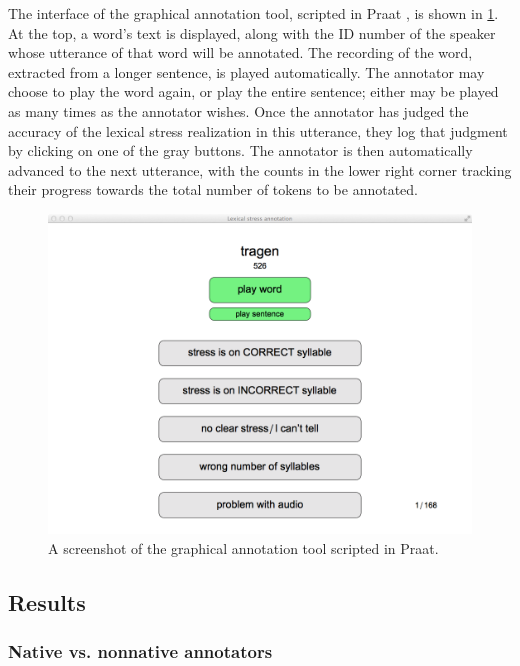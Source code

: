 	

	
	The interface of the graphical annotation tool, scripted in Praat \parencite{Boersma2014}, is shown in \cref{fig:annotationtool}. At the top, a word's text is displayed, along with the ID number of the speaker whose utterance of that word will be annotated. The recording of the word, extracted from a longer sentence, is played automatically. The annotator may choose to play the word again, or play the entire sentence; either may be played as many times as the annotator wishes. Once the annotator has judged the accuracy of the lexical stress realization in this utterance, they log that judgment by clicking on one of the gray buttons. The annotator is then automatically advanced to the next utterance, with the counts in the lower right corner tracking their progress towards the total number of tokens to be annotated. 
	
		\begin{figure}[bht]
			\centering
			\includegraphics[width=\textwidth]{../img/screenshots/AnnotationTool}
			\caption{A screenshot of the graphical annotation tool scripted in Praat.  }
			\label{fig:annotationtool}
		\end{figure}
	
	\subsection{Results}
	
	
	
		\subsubsection{Native vs. nonnative annotators}

